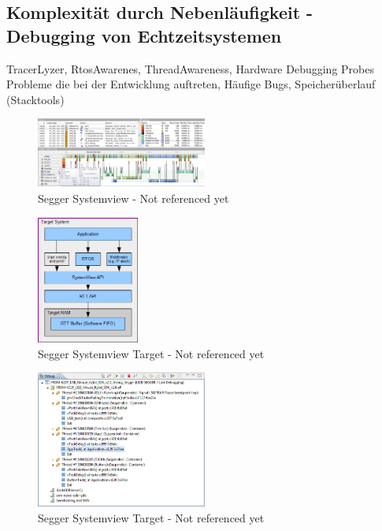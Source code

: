 \subsection{Komplexität durch Nebenläufigkeit - Debugging von Echtzeitsystemen}
\label{sec:Debugging von Echtzeitsystemen}
TracerLyzer, RtosAwarenes, ThreadAwareness, Hardware Debugging Probes 
Probleme die bei der Entwicklung auftreten, Häufige Bugs, Speicherüberlauf (Stacktools)
\begin{figure}[ht!]
	\centering
		\includegraphics[width=0.5\textwidth]{Pictures/Segger/systemview.png}
	\caption{Segger Systemview - Not referenced yet}
	\label{fig:Systemview}
\end{figure}
\begin{figure}[ht!]
	\centering
		\includegraphics[width=0.3\textwidth]{Pictures/Segger/SystemViewTarget.png}
	\caption{Segger Systemview Target - Not referenced yet}
	\label{fig:SystemviewTarget}
\end{figure}
\begin{figure}[ht!]
	\centering
		\includegraphics[width=0.5\textwidth]{Pictures/Segger/freertosThreadAwareness}
	\caption{Segger Systemview Target - Not referenced yet}
	\label{fig:SystemviewTarget}
\end{figure}